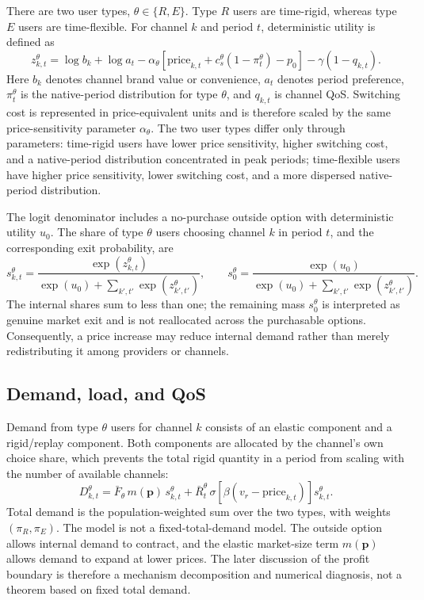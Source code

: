 \documentclass[11pt,a4paper]{article}
\newcommand{\D}{D}
\newcommand{\p}{\boldsymbol{p}}
\begin{document}
There are two user types, $\theta\in\{R,E\}$. Type $R$ users are time-rigid, whereas type $E$ users are time-flexible. For channel $k$ and period $t$, deterministic utility is defined as
\begin{equation}
  z^\theta_{k,t}=\log b_k+\log a_t
  -\alpha_\theta\!\left[\text{price}_{k,t}+c_s^\theta(1-\pi^\theta_t)-p_0\right]
  -\gamma(1-q_{k,t}).
  \label{eq:utility}
\end{equation}
Here $b_k$ denotes channel brand value or convenience, $a_t$ denotes period preference, $\pi^\theta_t$ is the native-period distribution for type $\theta$, and $q_{k,t}$ is channel QoS. Switching cost is represented in price-equivalent units and is therefore scaled by the same price-sensitivity parameter $\alpha_\theta$. The two user types differ only through parameters: time-rigid users have lower price sensitivity, higher switching cost, and a native-period distribution concentrated in peak periods; time-flexible users have higher price sensitivity, lower switching cost, and a more dispersed native-period distribution.

The logit denominator includes a no-purchase outside option with deterministic utility $u_0$. The share of type $\theta$ users choosing channel $k$ in period $t$, and the corresponding exit probability, are
\begin{equation}
  s^\theta_{k,t}=\frac{\exp(z^\theta_{k,t})}{\exp(u_0)+\sum_{k',t'}\exp(z^\theta_{k',t'})},
  \qquad
  s^\theta_0=\frac{\exp(u_0)}{\exp(u_0)+\sum_{k',t'}\exp(z^\theta_{k',t'})}.
  \label{eq:share}
\end{equation}
The internal shares sum to less than one; the remaining mass $s^\theta_0$ is interpreted as genuine market exit and is not reallocated across the purchasable options. Consequently, a price increase may reduce internal demand rather than merely redistributing it among providers or channels.

\subsection{Demand, load, and QoS}

Demand from type $\theta$ users for channel $k$ consists of an elastic component and a rigid/replay component. Both components are allocated by the channel's own choice share, which prevents the total rigid quantity in a period from scaling with the number of available channels:
\begin{equation}
  \D^\theta_{k,t}=\bar F_\theta\,m(\p)\,s^\theta_{k,t}
  +\bar R^\theta_t\,\sigma[\beta(v_r-\text{price}_{k,t})]s^\theta_{k,t}.
  \label{eq:demand}
\end{equation}
Total demand is the population-weighted sum over the two types, with weights $(\pi_R,\pi_E)$. The model is not a fixed-total-demand model. The outside option allows internal demand to contract, and the elastic market-size term $m(\p)$ allows demand to expand at lower prices. The later discussion of the profit boundary is therefore a mechanism decomposition and numerical diagnosis, not a theorem based on fixed total demand.
\end{document}
